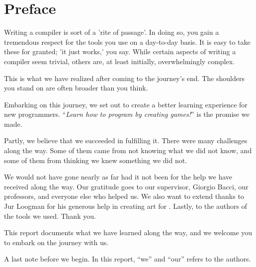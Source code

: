 \chapter*{Preface}
\thispagestyle{empty}

Writing a compiler is sort of a 'rite of passage'. In doing so, you gain a tremendous respect for the tools you use on a day-to-day basis. It is easy to take these for granted; 'it just works,' you say. While certain aspects of writing a compiler seem trivial, others are, at least initially, overwhelmingly complex.

This is what we have realized after coming to the journey's end. The shoulders you stand on are often broader than you think.

Embarking on this journey, we set out to create a better learning experience for new programmers. ``\textit{Learn how to program by creating games!}'' is the promise we made.

Partly, we believe that we succeeded in fulfilling it. There were many challenges along the way. Some of them came from not knowing what we did not know, and some of them from thinking we knew something we did not.

We would not have gone nearly as far had it not been for the help we have received along the way. Our gratitude goes to our supervisor, Giorgio Bacci, our professors, and everyone else who helped us. We also want to extend thanks to Jur Loogman for his generous help in creating art for \dazel{}. Lastly, to the authors of the tools we used. Thank you.

This report documents what we have learned along the way, and we welcome you to embark on the journey with us.

A last note before we begin. In this report, ``we'' and ``our'' refers to the authors.